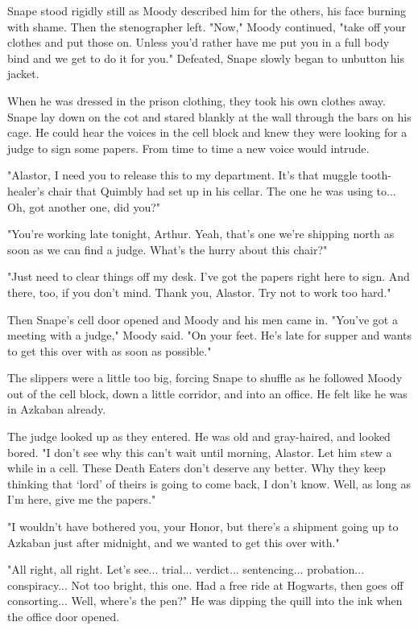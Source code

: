 Snape stood rigidly still as Moody described him for the others, his face burning with shame. Then the stenographer left. "Now," Moody continued, "take off your clothes and put those on. Unless you'd rather have me put you in a full body bind and we get to do it for you." Defeated, Snape slowly began to unbutton his jacket.

When he was dressed in the prison clothing, they took his own clothes away. Snape lay down on the cot and stared blankly at the wall through the bars on his cage. He could hear the voices in the cell block and knew they were looking for a judge to sign some papers. From time to time a new voice would intrude.

"Alastor, I need you to release this to my department. It's that muggle tooth-healer's chair that Quimbly had set up in his cellar. The one he was using to... Oh, got another one, did you?"

"You're working late tonight, Arthur. Yeah, that's one we're shipping north as soon as we can find a judge. What's the hurry about this chair?"

"Just need to clear things off my desk. I've got the papers right here to sign. And there, too, if you don't mind. Thank you, Alastor. Try not to work too hard."

Then Snape's cell door opened and Moody and his men came in. "You've got a meeting with a judge," Moody said. "On your feet. He's late for supper and wants to get this over with as soon as possible."

The slippers were a little too big, forcing Snape to shuffle as he followed Moody out of the cell block, down a little corridor, and into an office. He felt like he was in Azkaban already.

The judge looked up as they entered. He was old and gray-haired, and looked bored. "I don't see why this can't wait until morning, Alastor. Let him stew a while in a cell. These Death Eaters don't deserve any better. Why they keep thinking that `lord' of theirs is going to come back, I don't know. Well, as long as I'm here, give me the papers."

"I wouldn't have bothered you, your Honor, but there's a shipment going up to Azkaban just after midnight, and we wanted to get this over with."

"All right, all right. Let's see... trial... verdict... sentencing... probation... conspiracy... Not too bright, this one. Had a free ride at Hogwarts, then goes off consorting... Well, where's the pen?" He was dipping the quill into the ink when the office door opened.

